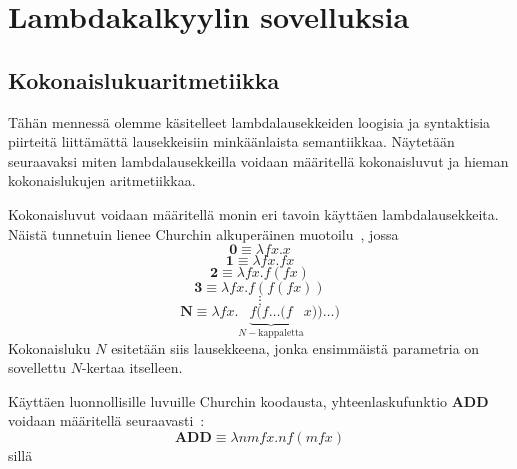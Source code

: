 \section{Lambdakalkyylin sovelluksia}

\subsection{Kokonaislukuaritmetiikka}
Tähän mennessä olemme käsitelleet lambdalausekkeiden loogisia ja syntaktisia piirteitä liittämättä lausekkeisiin minkäänlaista semantiikkaa. Näytetään seuraavaksi miten lambdalausekkeilla voidaan määritellä kokonaisluvut ja hieman kokonaislukujen aritmetiikkaa.
\par   
Kokonaisluvut voidaan määritellä monin eri tavoin käyttäen lambdalausekkeita. Näistä tunnetuin lienee Churchin alkuperäinen muotoilu~\cite[s.~20]{Sel2013}, jossa
\[ \textbf{0} \equiv \lambda fx . x \]
\[ \textbf{1} \equiv \lambda fx . fx \]
\[ \textbf{2} \equiv \lambda fx . f (fx) \] 
\[ \textbf{3} \equiv \lambda fx . f(f(fx)) \]
\[ \vdots \]
\[ \textbf{N} \equiv \lambda fx . \underbrace{ f ( f \ldots (f }_{ N-\text{kappaletta}} x)) \ldots ) \]
Kokonaisluku $N$ esitetään siis lausekkeena, jonka ensimmäistä parametria on sovellettu $N$-kertaa itselleen.
\par
Käyttäen luonnollisille luvuille Churchin koodausta, yhteenlaskufunktio \textbf{ADD} voidaan määritellä seuraavasti~\cite[s.~20]{Sel2013}:
\[ \textbf{ADD} \equiv \lambda nmfx . n f (m f x) \] 
sillä 
